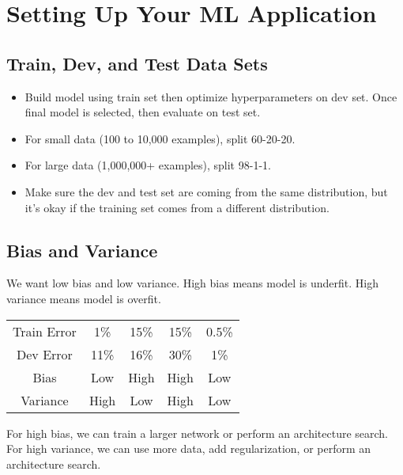 \section{Setting Up Your ML Application}

\subsection{Train, Dev, and Test Data Sets}

\begin{itemize}[wide, labelwidth=!, labelindent=0pt]
\itemsep0em 
    \item Build model using train set then optimize hyperparameters on dev set. Once final model is selected, then evaluate on test set.
    \item For small data (100 to 10,000 examples), split 60-20-20.
    \item For large data (1,000,000+ examples), split 98-1-1.
    \item Make sure the dev and test set are coming from the same distribution, but it's okay if the training set comes from a different distribution. \vspace*{-\baselineskip}
\end{itemize}

\subsection{Bias and Variance}

We want low bias and low variance. High bias means model is underfit. High variance means model is overfit.

\vspace{-2.5mm}
\begin{center}
\begin{tabular}{ c c c c c}
Train Error & 1\% & 15\% & 15\% & 0.5\% \\ 
Dev Error & 11\% & 16\% & 30\% & 1\% \\  
Bias & Low & High & High & Low \\  
Variance & High & Low & High & Low \vspace{-2.5mm}
\end{tabular}
\end{center}

For high bias, we can train a larger network or perform an architecture search. For high variance, we can use more data, add regularization, or perform an architecture search.


